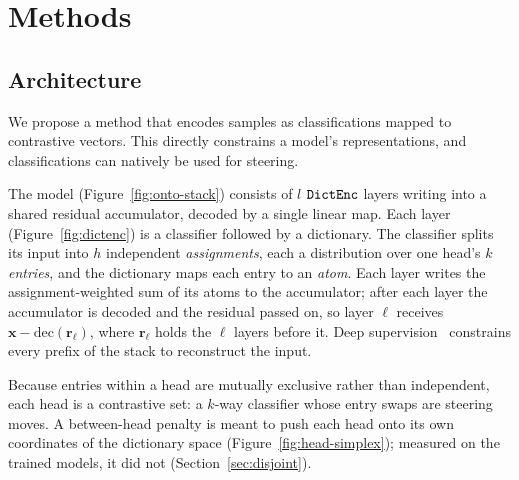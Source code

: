 \section{Methods}

\subsection{Architecture}
\label{sec:arch}
We propose a method that encodes samples as classifications mapped to
contrastive vectors. This directly constrains a model's representations,
and classifications can natively be used for steering.

The model (Figure~\ref{fig:onto-stack}) consists of $l$ $\mathop{\mathtt{DictEnc}}\limits$
layers writing into a shared residual accumulator, decoded by a single
linear map. Each layer (Figure~\ref{fig:dictenc}) is a classifier
followed by a dictionary. The classifier splits its input into $h$
independent \emph{assignments}, each a distribution over one head's $k$
\emph{entries}, and the dictionary maps each entry to an \emph{atom}.
Each layer writes the assignment-weighted sum of its atoms to the
accumulator; after each layer the accumulator is decoded and the residual
passed on, so layer $\ell$ receives $\mathbf{x} - \mathrm{dec}(\mathbf{r}_\ell)$,
where $\mathbf{r}_\ell$ holds the $\ell$ layers before it. Deep
supervision~\cite{lee2015deeply} constrains every prefix of the stack to
reconstruct the input.

Because entries within a head are mutually exclusive rather than
independent, each head is a contrastive set: a $k$-way classifier whose
entry swaps are steering moves. A between-head penalty is meant to push
each head onto its own coordinates of the dictionary space
(Figure~\ref{fig:head-simplex}); measured on the trained models, it did
not (Section~\ref{sec:disjoint}).

